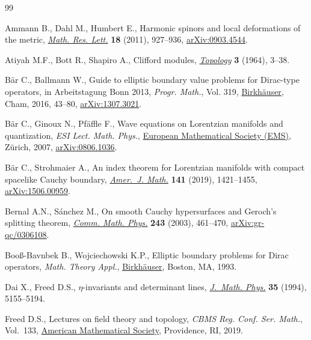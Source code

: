\documentclass[10pt,a4paper]{amsart}
\numberwithin{equation}{section}
\begin{document}
\begin{thebibliography}{99}
\footnotesize\itemsep=0pt

Ammann B., Dahl M., Humbert E., Harmonic spinors and local deformations of the
 metric, \href{https://doi.org/10.4310/MRL.2011.v18.n5.a10}{\textit{Math. Res. Lett.}} \textbf{18} (2011), 927--936,
 \href{https://arxiv.org/abs/0903.4544}{arXiv:0903.4544}.

Atiyah M.F., Bott R., Shapiro A., Clifford modules, \href{https://doi.org/10.1016/0040-9383(64)90003-5}{\textit{Topology}}
 \textbf{3} (1964), 3--38.

B\"ar C., Ballmann W., Guide to elliptic boundary value problems for
 {D}irac-type operators, in Arbeitstagung {B}onn 2013, \textit{Progr. Math.},
 Vol. 319, \href{https://doi.org/10.1007/978-3-319-43648-7_3}{Birkh\"auser}, Cham, 2016, 43--80, \href{https://arxiv.org/abs/1307.3021}{arXiv:1307.3021}.

B\"ar C., Ginoux N., Pf\"affle F., Wave equations on {L}orentzian manifolds and
 quantization, \textit{ESI Lect. Math. Phys.}, \href{https://doi.org/10.4171/037}{European Mathematical Society (EMS)},
 Z\"urich, 2007, \href{https://arxiv.org/abs/0806.1036}{arXiv:0806.1036}.

B\"ar C., Strohmaier A., An index theorem for {L}orentzian manifolds with
 compact spacelike {C}auchy boundary, \href{https://doi.org/10.1353/ajm.2019.0037}{\textit{Amer.~J. Math.}} \textbf{141}
 (2019), 1421--1455, \href{https://arxiv.org/abs/1506.00959}{arXiv:1506.00959}.

Bernal A.N., S\'anchez M., On smooth {C}auchy hypersurfaces and {G}eroch's
 splitting theorem, \href{https://doi.org/10.1007/s00220-003-0982-6}{\textit{Comm. Math. Phys.}} \textbf{243} (2003), 461--470,
 \href{https://arxiv.org/abs/gr-qc/0306108}{arXiv:gr-qc/0306108}.

Boo{\ss}-Bavnbek B., Wojciechowski K.P., Elliptic boundary problems for {D}irac
 operators, \textit{Math. Theory Appl.}, \href{https://doi.org/10.1007/978-1-4612-0337-7}{Birkh\"auser}, Boston, MA, 1993.

Dai X., Freed D.S., {$\eta$}-invariants and determinant lines, \href{https://doi.org/10.1063/1.530747}{\textit{J.~Math. Phys.}} \textbf{35} (1994),
 5155--5194.

Freed D.S., Lectures on field theory and topology, \textit{CBMS Reg. Conf. Ser.
 Math.}, Vol.~133, \href{https://doi.org/10.1090/cbms/133}{American Mathematical Society}, Providence, RI, 2019.


\end{thebibliography}
\end{document}
